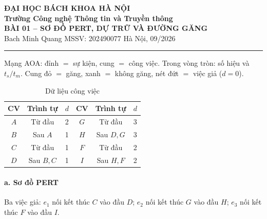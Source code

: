 \documentclass[11pt,a4paper]{article}
\begin{document}
\begin{center}
  {\large\bfseries ĐẠI HỌC BÁCH KHOA HÀ NỘI}\\[1pt]
  {\bfseries Trường Công nghệ Thông tin và Truyền thông}\\[5pt]
  {\Large\bfseries BÀI 01 -- SƠ ĐỒ PERT, DỰ TRỮ VÀ ĐƯỜNG GĂNG}\\[2pt]
  {\small Bach Minh Quang \quad MSSV: 202490077 \quad Hà Nội, 09/2026}
\end{center}
\vspace{-3pt}
\hrule
\vspace{7pt}

Mạng AOA: đỉnh $=$ sự kiện, cung $=$ công việc. Trong vòng tròn: số hiệu và $t_s/t_m$.
Cung đỏ $=$ găng, xanh $=$ không găng, nét đứt $=$ việc giả ($d=0$).

\vspace{2pt}
\begin{table}[H]\centering
\caption{Dữ liệu công việc}
\small
\begin{tabular}{cccccc}
\toprule
\textbf{CV} & \textbf{Trình tự} & \textbf{$d$} & \textbf{CV} & \textbf{Trình tự} & \textbf{$d$}\\
\midrule
$A$ & Từ đầu & 2 & $G$ & Từ đầu & 3\\
$B$ & Sau $A$ & 1 & $H$ & Sau $D,G$ & 3\\
$C$ & Từ đầu & 1 & $F$ & Từ đầu & 2\\
$D$ & Sau $B,C$ & 1 & $I$ & Sau $H,F$ & 2\\
\bottomrule
\end{tabular}
\end{table}

\paragraph{a. Sơ đồ PERT}
Ba việc giả: $e_1$ nối kết thúc $C$ vào đầu $D$; $e_2$ nối kết thúc $G$ vào đầu $H$; $e_3$ nối kết thúc $F$ vào đầu $I$.
\end{document}
